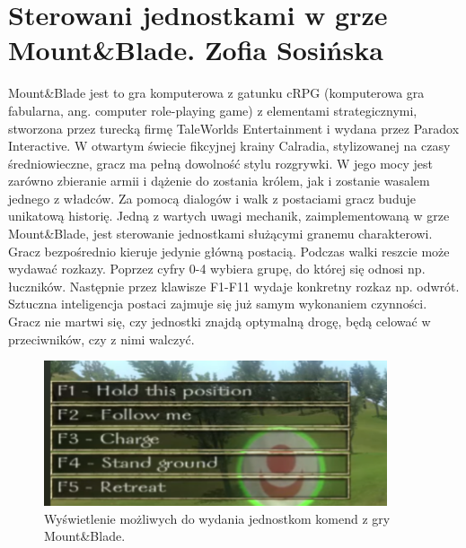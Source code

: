 \section{Sterowani jednostkami w grze Mount\&Blade. Zofia Sosińska}\label{chap:mb}

Mount\&Blade jest to gra komputerowa z gatunku cRPG (komputerowa gra fabularna, ang. computer role-playing game) z elementami strategicznymi, stworzona przez turecką firmę TaleWorlds Entertainment i wydana przez Paradox Interactive. W otwartym świecie fikcyjnej krainy Calradia, stylizowanej na czasy średniowieczne, gracz ma pełną dowolność stylu rozgrywki. W jego mocy jest zarówno zbieranie armii i dążenie do zostania królem, jak i zostanie wasalem jednego z władców. Za pomocą dialogów i walk z postaciami gracz buduje unikatową historię.
Jedną z wartych uwagi mechanik, zaimplementowaną w grze Mount\&Blade, jest sterowanie jednostkami służącymi granemu charakterowi. Gracz bezpośrednio kieruje jedynie główną postacią. Podczas walki reszcie może wydawać rozkazy. Poprzez cyfry 0-4 wybiera grupę, do której się odnosi np. łuczników. Następnie przez klawisze F1-F11 wydaje konkretny rozkaz np. odwrót. Sztuczna inteligencja postaci zajmuje się już samym wykonaniem czynności. Gracz nie martwi się, czy jednostki znajdą optymalną drogę, będą celować w przeciwników, czy z nimi walczyć.

\begin{figure}[htbp]
    \centering
    \includegraphics[width=0.9\textwidth]{images/ui/commandsMountBla.png}
    \caption{Wyświetlenie możliwych do wydania jednostkom komend z gry Mount\&Blade.
    }\label{fig:MountnBlade}
\end{figure}
